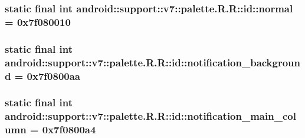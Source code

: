 \hypertarget{classandroid_1_1support_1_1v7_1_1palette_1_1_r_1_1id_c2bae328e3b469614d99c841aa5781a0}{
\subsubsection[{normal}]{\setlength{\rightskip}{0pt plus 5cm}static final int android::support::v7::palette.R.R::id::normal = 0x7f080010}}
\label{classandroid_1_1support_1_1v7_1_1palette_1_1_r_1_1id_c2bae328e3b469614d99c841aa5781a0}


\hypertarget{classandroid_1_1support_1_1v7_1_1palette_1_1_r_1_1id_cdd4d284d1d33f8a78d78213c090211c}{
\subsubsection[{notification\_\-background}]{\setlength{\rightskip}{0pt plus 5cm}static final int android::support::v7::palette.R.R::id::notification\_\-background = 0x7f0800aa}}
\label{classandroid_1_1support_1_1v7_1_1palette_1_1_r_1_1id_cdd4d284d1d33f8a78d78213c090211c}


\hypertarget{classandroid_1_1support_1_1v7_1_1palette_1_1_r_1_1id_67ba3b67c4ccd3c91912999452a0477e}{
\subsubsection[{notification\_\-main\_\-column}]{\setlength{\rightskip}{0pt plus 5cm}static final int android::support::v7::palette.R.R::id::notification\_\-main\_\-column = 0x7f0800a4}}
\label{classandroid_1_1support_1_1v7_1_1palette_1_1_r_1_1id_67ba3b67c4ccd3c91912999452a0477e}


